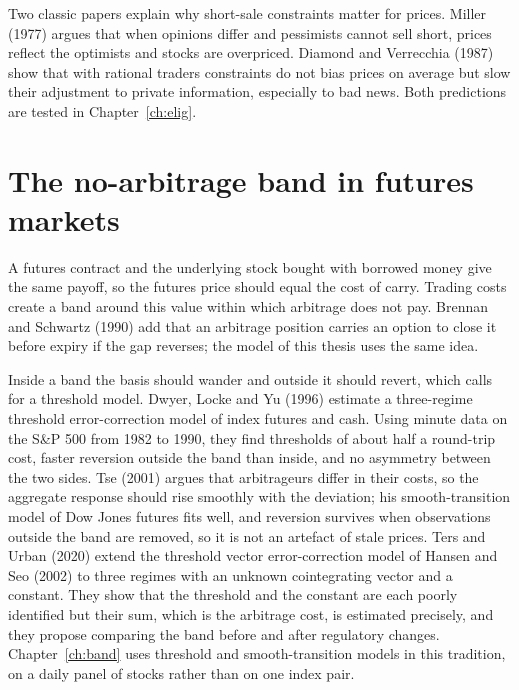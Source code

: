 Two classic papers explain why short-sale constraints matter for prices. Miller (1977) argues that when opinions differ
and pessimists cannot sell short, prices reflect the optimists and stocks are overpriced. Diamond and Verrecchia (1987)
show that with rational traders constraints do not bias prices on average but slow their adjustment to private
information, especially to bad news. Both predictions are tested in Chapter~\ref{ch:elig}.

\section{The no-arbitrage band in futures markets}
A futures contract and the underlying stock bought with borrowed money give the same payoff, so the futures price should
equal the cost of carry. Trading costs create a band around this value within which arbitrage does not pay. Brennan and
Schwartz (1990) add that an arbitrage position carries an option to close it before expiry if the gap reverses; the
model of this thesis uses the same idea.

Inside a band the basis should wander and outside it should revert, which calls for a threshold model. Dwyer, Locke and Yu (1996) estimate a three-regime
threshold error-correction model of index futures and cash. Using minute data on the S\&P 500 from 1982 to 1990, they find thresholds of about half a round-trip cost, faster
reversion outside the band than inside, and no asymmetry between the two sides. Tse (2001) argues that arbitrageurs differ
in their costs, so the aggregate response should rise smoothly with the deviation; his smooth-transition model of Dow
Jones futures fits well, and reversion survives when observations outside the band are removed, so it is not an artefact
of stale prices. Ters and Urban (2020) extend the threshold vector error-correction model of Hansen and Seo (2002) to three
regimes with an unknown cointegrating vector and a constant. They show that the threshold and the constant are each poorly
identified but their sum, which is the arbitrage cost, is estimated precisely, and they propose comparing the band before
and after regulatory changes. Chapter~\ref{ch:band} uses threshold and smooth-transition models in this tradition, on a
daily panel of stocks rather than on one index pair.

